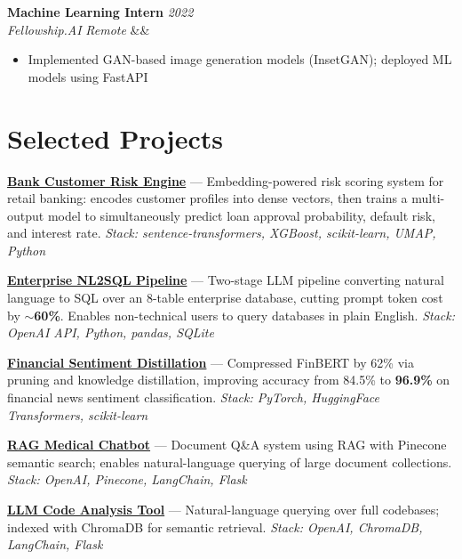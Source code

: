 \documentclass[10pt,a4paper]{article}
\newcommand{\cventry}[5]{%
  \noindent\textbf{#1} \hfill \textit{#2}\\
  \textit{#3} \hfill \textit{#4}%
  \ifx&#5&\else\\\textit{#5}\fi
  \vspace{2pt}
}
\begin{document}
\medskip
\cventry{Machine Learning Intern}{2022}{Fellowship.AI}{Remote}{}
\begin{itemize}
  \item Implemented GAN-based image generation models (InsetGAN); deployed ML models using FastAPI
\end{itemize}

\section{Selected Projects}

\noindent
\textbf{\href{https://github.com/adebanjiadelowo/llm-portfolio/tree/main/03-bank-customer-risk-engine}{Bank Customer Risk Engine}} ---
Embedding-powered risk scoring system for retail banking: encodes customer profiles into dense vectors, then trains a multi-output model to simultaneously predict loan approval probability, default risk, and interest rate.
\textit{Stack: sentence-transformers, XGBoost, scikit-learn, UMAP, Python}

\textbf{\href{https://github.com/adebanjiadelowo/llm-portfolio/tree/main/02-enterprise-nl2sql}{Enterprise NL2SQL Pipeline}} ---
Two-stage LLM pipeline converting natural language to SQL over an 8-table enterprise database, cutting prompt token cost by \textbf{$\sim$60\%}. Enables non-technical users to query databases in plain English.
\textit{Stack: OpenAI API, Python, pandas, SQLite}

\textbf{\href{https://github.com/adebanjiadelowo/llm-portfolio/tree/main/01-financial-sentiment-distillation}{Financial Sentiment Distillation}} ---
Compressed FinBERT by 62\% via pruning and knowledge distillation, improving accuracy from 84.5\% to \textbf{96.9\%} on financial news sentiment classification.
\textit{Stack: PyTorch, HuggingFace Transformers, scikit-learn}

\textbf{\href{https://github.com/AdebanjiAdelowo/generative-ai-portfolio/blob/main/End-to-End-AI-Applications/End-to-end-Medical-Chatbot-Generative-AI}{RAG Medical Chatbot}} --- Document Q\&A system using RAG with Pinecone semantic search; enables natural-language querying of large document collections. \textit{Stack: OpenAI, Pinecone, LangChain, Flask}

\textbf{\href{https://github.com/AdebanjiAdelowo/generative-ai-portfolio/blob/main/End-to-End-AI-Applications/End-to-end-Source-Code-Analysis-Generative-AI}{LLM Code Analysis Tool}} --- Natural-language querying over full codebases; indexed with ChromaDB for semantic retrieval. \textit{Stack: OpenAI, ChromaDB, LangChain, Flask}
\end{document}
